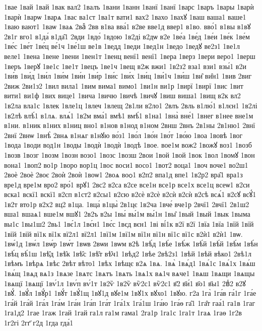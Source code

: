 {1вае
1вай
1вай
1вак
вал2
1валъ
1вани
1ванн
1ванї
1ванї
1варс
1варъ
1вары
1варѝ
1варѝ
1варѡ
1варѧ
1вас
ва1ст
1ва1т
вати1
вах2
1вахо
1вахꙋ
1ваш
ваша1
ваше1
1ваю
вают1
1ваѡ
1ваѧ
2ваⷤ
2вв
в1ва
вва́1
в2ве
вве1д
ввер1
в1во.
вво́1
в1вы
в1вꙋ
2в1г
вго1
в1да́
в1да̑1
2вди
1вдо́
1вдою
1в2ді
в2дѡ
в2е
1ве́а
1ве́д
1ве́и
1ве́к
1ве́м
1ве́с
1ве́т
1ве́ц
ве́1ч
1ве́1ш
ве1в
1ведд
1веди
1вед1н
1ведо
1ведꙋ
ве2з1
1ве1л
веле1
1вена
1вене
1вени
1вен1т
1венц
венї1
венї1
1вера
1верз
1вери
веро1
1верш
1веръ
1верꙋ
1ве1с
1ве1т
1вецъ
1ве1ч
1вещ
в2ж
вжи1
1в2з2
вза1
взи1
взы́1
в2и
1ви́в
1ви́д
1ви́л
1ви́м
1ви́н
1ви́р
1ви́с
1ви́х
1ви́ц
1ви́1ч
1ви́ш
1ви̑
ви̑н1
1вив
2виг
2виж
2ви1з2
1вил
вила1
1вим
вима1
вимо1
1ви1н
ви1р
1вирї
1вирї
1вис
1вит
вити1
ви1ф
1вих
вице1
1вича
1вичю
1вичѣ
1вичꙋ
1виш
виша1
1вищ
в2к
вл2
1в2ла
вла1с
1влек
1вле1ц
1влеч
1влещ
2в1ли
в2ло1
2влъ
2вль
в1лю́1
в1лєн1
1в2лі
1в2лѣ
влѣ́1
в1лѧ.
влѧ́1
1в2м
вма́1
вмѣ1
вмѣ́1
в1на1
1вна̀
вне́1
1внег
в1нее
вне1м
в1ни.
в1ник
в1них
в1ниц
вно1
в1нов
в1нод
в1ном
2внш
2внъ
2в1ны
2в1ню1
2внї
2внї
2внѡ
1внѣ̀
2внѧ
в1нѧг
в1нꙋю
во́з1
1во́л
1во́н
1во́т
1во́ю
1воа
1вовѣ
1вог
1вода
1води
вод1н
1воды
1водѝ
1водѝ
1водѣ
1вое.
вое1м
вож2
1вожꙋ
воз1
1возб
1возв
1возг
1возм
1возн
возо1
1возс
1возш
2вои
1вой
1вой
1вок
1вол
1вомꙋ
1вон
вона1
1воп2
во1р
1воро
вор1ц
1вос
воси1
восо1
1вот2
воца1
1воч
воче1
во2ш1
2воѐ
2воѐ
2воє
2воѝ
2воѝ
1воѡ1
2воѧ
воѻ1
в2п2
впа1д
впе1
1в2р2
вра̑1
вра1з
вре1д
вре1м
вро2
вро́1
врꙋ1
2вс2
в2са
в2се
все1н
все1р
все1х
все1ц
всеѡ1
в2си
вска1
вскї1
вскї1
в2сп
в1ст2
в2сы1
в2сю
в2сѐ
в2сѐ
в2сѝ
в2сѝ
в2сѣ
всѧ́1
в2сꙋ
всꙋ́1
1в2т
вто1р
в2х2
вц2
в1ца.
1вца́
в1цы̀
2в1цє
1в2ча
1вче́
вче1р
2вчї1
2вчї1
2в1ш2
вша1
вшаѧ1
вше1м
вшꙋ1
2в2ъ
в2ы
1вы́
вы́1м
вы́1н
1вы̑
1вый
1вый
1вык
1выма
вы1с
1вы1ш2
2вь1
1вє́1л
1вє́н1
1вє́с
1вєд
вєн1
1ві
ві́1к
в2ї
в2ї
1вїа
1вїа
1вїй
1вїй
1вїй
1вїй
вї1к
вї1к
вї2л1
вї2л1
1вї1м
1вї1м
вї1н
вї1н
вї1с
вї1с
в2ѝ1
в2ѝ1
1вѡ.
1вѡ́1д
1вѡ́л
1вѡ́р
1вѡ́т
1вѡв
2вѡи
1вѡм
в2ѣ
1вѣ́д
1вѣ́е
1вѣ́ж
1вѣ́й
1вѣ́й
1вѣ́м
1вѣ́н
1вѣ́ц
вѣ́1ш
1вѣ̑д
1вѣ̑к
1вѣ̑с
1вѣ̑т
вѣ̑ч1
1вѣд2
1вѣе
2вѣ2з1
1вѣй
1вѣй
вѣко1
2вѣ1л
1вѣмъ
1вѣрѧ
1вѣс
2вѣт
вѣто1
1вѣх
1вѣщє
в2ѧ
1вѧ.
1вѧ̀
1вѧ́д1
1вѧ́1с
1вѧ́1х
1вѧ́ш
1вѧ́щ
1вѧд
вѧ1з
1вѧзе
1вѧтс
1вѧтъ
1вѧть
1вѧ1х
вѧ1ч
вѧче1
1вѧш
1вѧщи
1вѧщы
1вѧщї
1вѧщї
1вѵ́1л
1вѵ́п
вѵ́1т
1в2ѷ
1в2ѷ
вѷ2с1
вѷ2с1
в҃2
в҃и́1
в҃о1
в҃ы1
2вⷣ2
в2ꙋ
1вꙋ́.
1вꙋ́л
1вꙋ́р1
1вꙋ́т
1вꙋ́1щ
1вꙋ1д
вꙋе1м
1вꙋ1х
вꙋхо1
1вꙋю.
г2а
1га̀
1га́в
га́1г
1га́е
1га́й
1га́й
1га́л
1га́м
1га́н
1га́п
1га́т
1га́1х
1га́1ш
1га́ю
1га́ѳ
га̑1
1га̑т
гаа́1
га1в
1гаг
1га1д2
1гае
1гаж
1гай
1гай
га1л
га1м
гама1
2га1р
1га1с
1га1т
1гаѧ
1гаѳ
1г2в
1г2гі
2гг҃
г2д
1гда
гда́1
}
